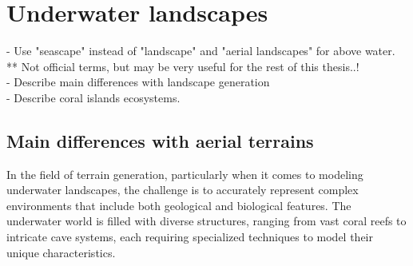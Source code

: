 







\section{Underwater landscapes}
- Use "seascape" instead of "landscape" and "aerial landscapes" for above water. \\
** Not official terms, but may be very useful for the rest of this thesis..! \\
- Describe main differences with landscape generation \\
- Describe coral islands ecosystems.

\subsection{Main differences with aerial terrains}
In the field of terrain generation, particularly when it comes to modeling underwater landscapes, the challenge is to accurately represent complex environments that include both geological and biological features. The underwater world is filled with diverse structures, ranging from vast coral reefs to intricate cave systems, each requiring specialized techniques to model their unique characteristics.

